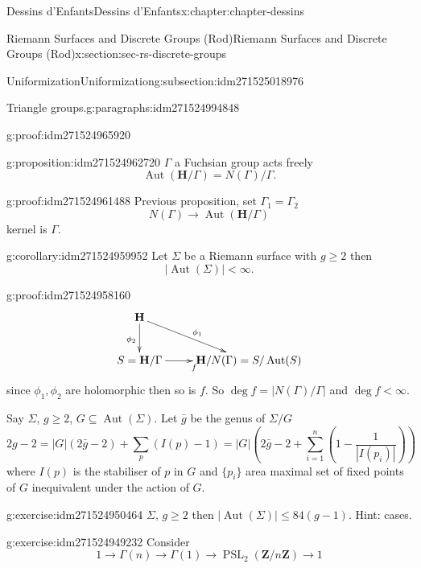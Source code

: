 \documentclass[oneside,10pt,]{book}
\numberwithin{equation}{section}
\newcommand{\ZZ}{\mathbf{Z}}
\newcommand{\HH}{\mathbf{H}}
\DeclareMathOperator{\Aut}{Aut}
\DeclareMathOperator{\PSL}{PSL}
\newcommand{\lt}{<}
\begin{document}
\begin{chapterptx}{Dessins d'Enfants}{}{Dessins d'Enfants}{}{}{x:chapter:chapter-dessins}
\begin{sectionptx}{Riemann Surfaces and Discrete Groups (Rod)}{}{Riemann Surfaces and Discrete Groups (Rod)}{}{}{x:section:sec-rs-discrete-groups}
\begin{subsectionptx}{Uniformization}{}{Uniformization}{}{}{g:subsection:idm271525018976}
\begin{paragraphs}{Triangle groups.}{g:paragraphs:idm271524994848}
\begin{proofptx}{}{g:proof:idm271524965920}
\end{proofptx}
\begin{proposition}{}{}{g:proposition:idm271524962720}%
\(\Gamma\) a Fuchsian group acts freely%
\begin{equation*}
\Aut(\HH/\Gamma) = N(\Gamma)/\Gamma\text{.}
\end{equation*}
%
\end{proposition}
\begin{proofptx}{}{g:proof:idm271524961488}
Previous proposition, set \(\Gamma_1 = \Gamma_2\)%
\begin{equation*}
N(\Gamma) \to \Aut(\HH/\Gamma)
\end{equation*}
kernel is \(\Gamma\).%
\end{proofptx}
\begin{corollary}{}{}{g:corollary:idm271524959952}%
Let \(\Sigma\) be a Riemann surface with \(g \ge 2\) then%
\begin{equation*}
|\Aut(\Sigma)| \lt \infty\text{.}
\end{equation*}
%
\end{corollary}
\begin{proofptx}{}{g:proof:idm271524958160}
%
\begin{equation*}
\xymatrix{
\HH \ar[dr]^{\phi_1} \ar[d]_{\phi_2}\\
S =\HH/\Gamma \ar[r]_f & \HH/N(\Gamma) = S/\Aut(S)
}
\end{equation*}
since \(\phi_1,\phi_2\) are holomorphic then so is \(f\). So \(\deg f=  | N(\Gamma) /\Gamma|\) and \(\deg f  \lt \infty\).%
\end{proofptx}
Say \(\Sigma\), \(g\ge 2\), \(G\subseteq \Aut(\Sigma)\). Let \(\bar g\) be the genus of \(\Sigma /G\)%
\begin{equation*}
2g - 2 = |G| (2\bar g - 2) + \sum_p (I(p) - 1) = |G|(2\bar g - 2 + \sum_{i=1}^n (1 - \frac{1}{|I(p_i)|}))
\end{equation*}
where \(I(p)\) is the stabiliser of \(p\) in \(G\) and \(\{p_i\}\) area maximal set of fixed points of \(G\) inequivalent under the action of \(G\).%
\begin{inlineexercise}{}{g:exercise:idm271524950464}%
\(\Sigma,\,g\ge 2\) then \(|\Aut(\Sigma)| \le 84(g-1)\). Hint: cases.%
\end{inlineexercise}
\begin{inlineexercise}{}{g:exercise:idm271524949232}%
Consider%
\begin{equation*}
1 \to \Gamma(n) \to \Gamma(1) \to \PSL_2(\ZZ/n\ZZ) \to 1
\end{equation*}

\end{inlineexercise}
\end{paragraphs}
\end{subsectionptx}
\end{sectionptx}
\end{chapterptx}
\end{document}
